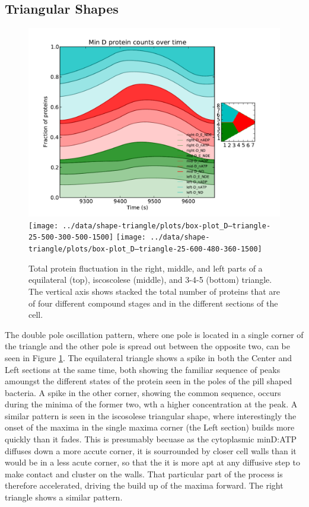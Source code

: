 \documentclass[letterpaper,twocolumn,amsmath,amssymb,pre]{revtex4-1}
\begin{document}
\subsection{Triangular Shapes}
\begin{figure}
  \includegraphics[width=\columnwidth]{../data/shape-triangle/plots/box-plot_D--triangle-25-400-400-400-1500}
  \texttt{[image: ../data/shape-triangle/plots/box-plot\_D--triangle-25-500-300-500-1500]}
  \texttt{[image: ../data/shape-triangle/plots/box-plot\_D--triangle-25-600-480-360-1500]}
  \caption{Total protein fluctuation in the right, middle, and left
    parts of a equilateral (top), iscoscolese (middle), and 3-4-5
    (bottom) triangle.  The vertical axis shows stacked the total
    number of proteins that are of four different compound stages and
    in the different sections of the cell.}
  \label{box-triangle}
\end{figure}

The double pole oscillation pattern, where one pole is located in a
single corner of the triangle and the other pole is spread out between
the opposite two, can be seen in Figure \ref{box-triangle}.  The
equilateral triangle shows a spike in both the Center and Left
sections at the same time, both showing the familiar sequence of peaks
amoungst the different states of the protein seen in the poles of the
pill shaped bacteria.  A spike in the other corner, showing the common
sequence, occurs during the minima of the former two, wth a higher
concentration at the peak.  A similar pattern is seen in the
iscosolese triangular shape, where interestingly the onset of the
maxima in the single maxima corner (the Left section) builds more
quickly than it fades.  This is presumably becuase as the cytoplasmic
minD:ATP diffuses down a more accute corner, it is sourrounded by
closer cell walls than it would be in a less acute corner, so that the
it is more apt at any diffusive step to make contact and cluster on
the walls.  That particular part of the process is therefore
accelerated, driving the build up of the maxima forward.  The right
triangle shows a similar pattern.
\end{document}
